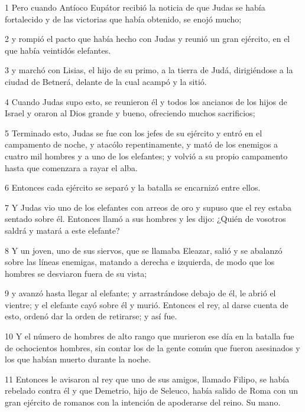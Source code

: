 \par 1 Pero cuando Antíoco Eupátor recibió la noticia de que Judas se había fortalecido y de las victorias que había obtenido, se enojó mucho;

\par 2 y rompió el pacto que había hecho con Judas y reunió un gran ejército, en el que había veintidós elefantes.

\par 3 y marchó con Lisias, el hijo de su primo, a la tierra de Judá, dirigiéndose a la ciudad de Betnerá, delante de la cual acampó y la sitió.

\par 4 Cuando Judas supo esto, se reunieron él y todos los ancianos de los hijos de Israel y oraron al Dios grande y bueno, ofreciendo muchos sacrificios;

\par 5 Terminado esto, Judas se fue con los jefes de su ejército y entró en el campamento de noche, y atacólo repentinamente, y mató de los enemigos a cuatro mil hombres y a uno de los elefantes; y volvió a su propio campamento hasta que comenzara a rayar el alba.

\par 6 Entonces cada ejército se separó y la batalla se encarnizó entre ellos.

\par 7 Y Judas vio uno de los elefantes con arreos de oro y supuso que el rey estaba sentado sobre él. Entonces llamó a sus hombres y les dijo: ¿Quién de vosotros saldrá y matará a este elefante?

\par 8 Y un joven, uno de sus siervos, que se llamaba Eleazar, salió y se abalanzó sobre las líneas enemigas, matando a derecha e izquierda, de modo que los hombres se desviaron fuera de su vista;

\par 9 y avanzó hasta llegar al elefante; y arrastrándose debajo de él, le abrió el vientre; y el elefante cayó sobre él y murió. Entonces el rey, al darse cuenta de esto, ordenó dar la orden de retirarse; y así fue.

\par 10 Y el número de hombres de alto rango que murieron ese día en la batalla fue de ochocientos hombres, sin contar los de la gente común que fueron asesinados y los que habían muerto durante la noche.

\par 11 Entonces le avisaron al rey que uno de sus amigos, llamado Filipo, se había rebelado contra él y que Demetrio, hijo de Seleuco, había salido de Roma con un gran ejército de romanos con la intención de apoderarse del reino. Su mano.

